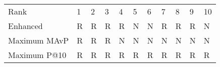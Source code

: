 \begin{tabular}{lllllllllll}
Rank & 1 & 2 & 3 & 4 & 5 & 6 & 7 & 8 & 9 & 10 \\
Enhanced & R & R & R & R & N & N & R & R & R & N \\
Maximum MAvP & R & R & R & N & N & N & N & N & N & N \\
Maximum P@10 & R & R & R & R & R & R & R & R & R & R \\
\end{tabular}
